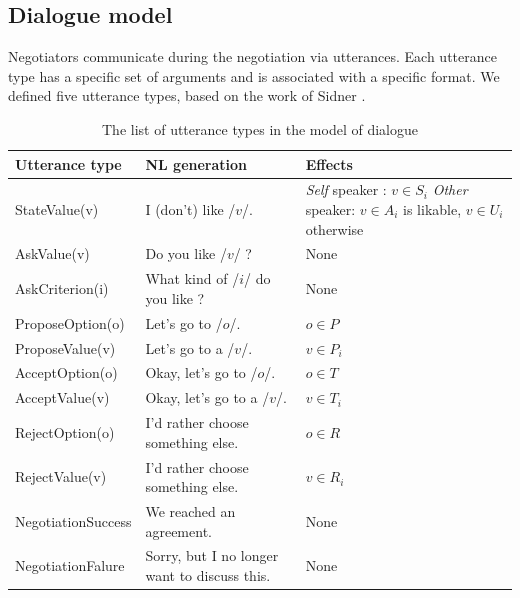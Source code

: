 \documentclass{llncs}
\begin{document}
	\subsection{Dialogue model}
	Negotiators communicate during the negotiation via utterances. Each utterance type has a specific set of arguments and is associated with a specific format. We defined five utterance types, based on the work of Sidner \cite{sidnerartificial}.
		\begin{table}[t]
			{\scriptsize
			\begin{tabular} {|p{2.75cm}|p{4cm}|p{3cm}|}
				\hline
				Utterance type  & NL generation & Effects\\
				\hline
				StateValue(v) &  I (don't) like /$v$/. & \textit{Self} speaker : $v \in S_i$ \newline \textit{Other} speaker:  \newline $v\in A_i$ is likable, $v\in U_i$ otherwise \\
				\hline
				 AskValue(v)& Do you like /$v$/ ? & None \\
				 \hline
				 AskCriterion(i) &  What kind of /$i$/ do you like ? & None\\
				 \hline
				 ProposeOption(o)  & Let's go to /$o$/. & $o \in P$\\
				 \hline
				 ProposeValue(v) & Let's go to a /$v$/. & $v \in P_i$\\
				 \hline
				 AcceptOption(o)& Okay, let's go to /$o$/.& $o \in T$ \\
				 \hline
				 AcceptValue(v) & Okay, let's go to a /$v$/.& $v \in T_i$ \\
				\hline
				 RejectOption(o) & I'd rather choose  something else. & $o \in R$\\
				 \hline
				 RejectValue(v) &  I'd rather choose  something else. & $v \in R_i$ \\
				 \hline
				 NegotiationSuccess &  We reached an agreement. & None\\
				 \hline
				 NegotiationFalure &  Sorry, but I no longer want to discuss this. & None\\
				 \hline
			\end{tabular}
			}
			\caption{The list of utterance types in the model of dialogue}
		\end{table}
\end{document}
